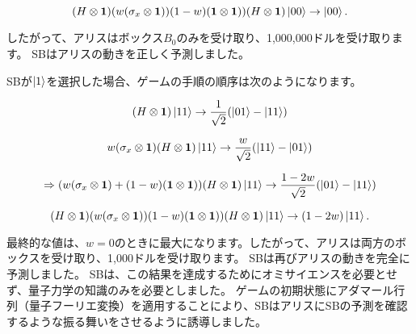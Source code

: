 \begin{equation}
\label{167}
( H  \otimes \mathbf{1})(w(\sigma_x \otimes \mathbf{1})) 
(1 - w)(\mathbf{1} \otimes \mathbf{1}))(H \otimes \mathbf{1}) \ket{00}
\to
\ket{00}.
\end{equation}


したがって、アリスはボックス$B_0$のみを受け取り、1,000,000ドルを受け取ります。 SBはアリスの動きを正しく予測しました。

SBが$\ket{1}$を選択した場合、ゲームの手順の順序は次のようになります。

\begin{equation}
\label{168}
(H \otimes \mathbf{1}) \ket{11}
\to
\frac{1}{\sqrt{2}}
(\ket{01} - \ket{11})
\end{equation}

\begin{equation}
\label{169}
w(\sigma_x \otimes \mathbf{1})
(H \otimes \mathbf{1}) \ket{11}
\to
\frac{w}{\sqrt{2}}
(\ket{11} - \ket{01})
\end{equation}

\begin{equation}
\label{170}
\Rightarrow
(w( \sigma_x \otimes \mathbf{1}) + (1 - w)
(\mathbf{1} \otimes \mathbf{1}))(H \otimes \mathbf{1}) \ket{11}
\to
\frac{1 - 2w}{\sqrt{2}}
(\ket{01} - \ket{11})
\end{equation}

\begin{equation}
\label{171}
( H  \otimes \mathbf{1})(w(\sigma_x \otimes \mathbf{1})) 
(1 - w)(\mathbf{1} \otimes \mathbf{1}))(H \otimes \mathbf{1}) \ket{11}
\to
(1-2w)\ket{11}.
\end{equation}

最終的な値は、$w = 0$のときに最大になります。したがって、アリスは両方のボックスを受け取り、1,000ドルを受け取ります。 SBは再びアリスの動きを完全に予測しました。 SBは、この結果を達成するためにオミサイエンスを必要とせず、量子力学の知識のみを必要としました。 ゲームの初期状態にアダマール行列（量子フーリエ変換）を適用することにより、SBはアリスにSBの予測を確認するような振る舞いをさせるように誘導しました。
